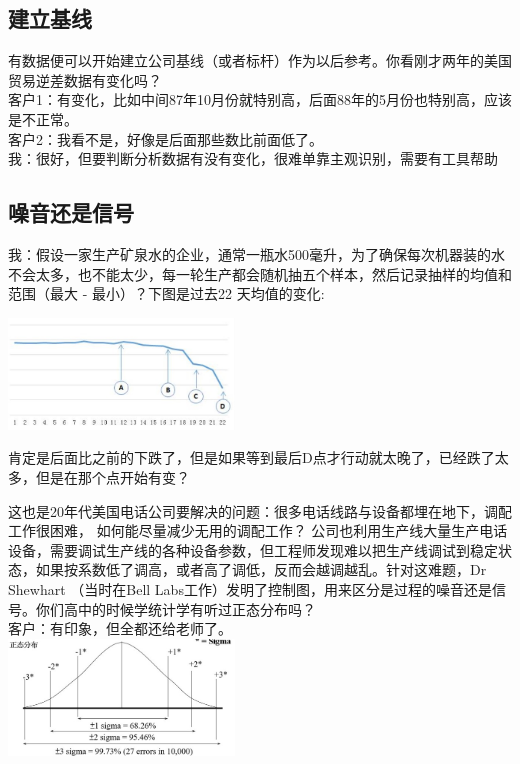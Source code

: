 \hypertarget{ux5efaux7acbux57faux7ebf}{%
\subsection{建立基线}\label{ux5efaux7acbux57faux7ebf}}

有数据便可以开始建立公司基线（或者标杆）作为以后参考。你看刚才两年的美国贸易逆差数据有变化吗？\\
客户1：有变化，比如中间87年10月份就特别高，后面88年的5月份也特别高，应该是不正常。\\
客户2：我看不是，好像是后面那些数比前面低了。\\
我：很好，但要判断分析数据有没有变化，很难单靠主观识别，需要有工具帮助

\hypertarget{ux566aux97f3ux8fd8ux662fux4fe1ux53f7}{%
\subsection{噪音还是信号}\label{ux566aux97f3ux8fd8ux662fux4fe1ux53f7}}

我：假设一家生产矿泉水的企业，通常一瓶水500毫升，为了确保每次机器装的水不会太多，也不能太少，每一轮生产都会随机抽五个样本，然后记录抽样的均值和范围（最大
- 最小）？下图是过去22 天均值的变化:


\includegraphics[width=6cm]{DistillWaterCC.jpg}

肯定是后面比之前的下跌了，但是如果等到最后D点才行动就太晚了，已经跌了太多，但是在那个点开始有变？

这也是20年代美国电话公司要解决的问题：很多电话线路与设备都埋在地下，调配工作很困难，
如何能尽量减少无用的调配工作？
公司也利用生产线大量生产电话设备，需要调试生产线的各种设备参数，但工程师发现难以把生产线调试到稳定状态，如果按系数低了调高，或者高了调低，反而会越调越乱。针对这难题，Dr
Shewhart （当时在Bell
Labs工作）发明了控制图，用来区分是过程的噪音还是信号。你们高中的时候学统计学有听过正态分布吗？\\
客户：有印象，但全都还给老师了。\\

\includegraphics[width=6cm]{NormalDistPicture1.jpg}

